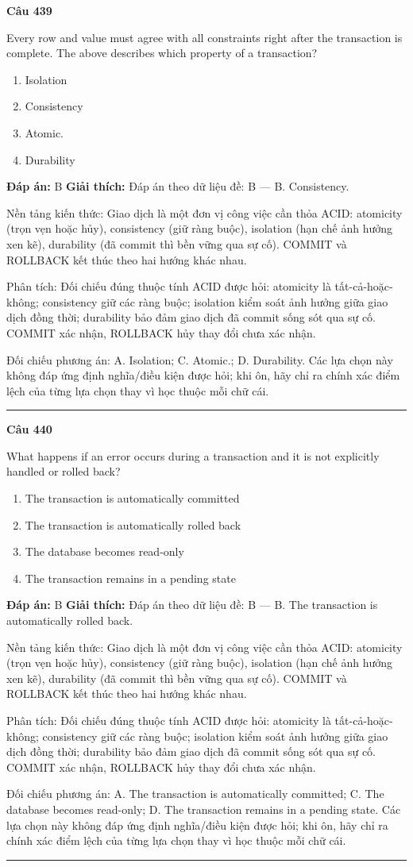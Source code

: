 \documentclass[11pt,a4paper]{article}
\newenvironment{question}[1]{%
  \par\vspace{1em}\noindent\textbf{\large Câu #1}\par\vspace{0.4em}
}{%
  \par\vspace{1em}\hrule\vspace{0.6em}
}
\newenvironment{choices}{%
  \begin{enumerate}[label=\textbf{\Alph*.},leftmargin=2.2em,itemsep=2pt,topsep=3pt]
}{%
  \end{enumerate}
}
\newcommand{\choice}{\item}
\begin{document}
\begin{question}{439}
Every row and value must agree with all constraints right after the transaction is complete. The above describes which property of a transaction?
\begin{choices}
\choice Isolation
\choice Consistency
\choice Atomic.
\choice Durability
\end{choices}
\textbf{Đáp án:} B
\textbf{Giải thích:} Đáp án theo dữ liệu đề: B — B. Consistency.

Nền tảng kiến thức: Giao dịch là một đơn vị công việc cần thỏa ACID: atomicity (trọn vẹn hoặc hủy), consistency (giữ ràng buộc), isolation (hạn chế ảnh hưởng xen kẽ), durability (đã commit thì bền vững qua sự cố). COMMIT và ROLLBACK kết thúc theo hai hướng khác nhau.

Phân tích: Đối chiếu đúng thuộc tính ACID được hỏi: atomicity là tất-cả-hoặc-không; consistency giữ các ràng buộc; isolation kiểm soát ảnh hưởng giữa giao dịch đồng thời; durability bảo đảm giao dịch đã commit sống sót qua sự cố. COMMIT xác nhận, ROLLBACK hủy thay đổi chưa xác nhận.

Đối chiếu phương án: A. Isolation; C. Atomic.; D. Durability. Các lựa chọn này không đáp ứng định nghĩa/điều kiện được hỏi; khi ôn, hãy chỉ ra chính xác điểm lệch của từng lựa chọn thay vì học thuộc mỗi chữ cái.
\end{question}

\begin{question}{440}
What happens if an error occurs during a transaction and it is not explicitly handled or rolled back?
\begin{choices}
\choice The transaction is automatically committed
\choice The transaction is automatically rolled back
\choice The database becomes read-only
\choice The transaction remains in a pending state
\end{choices}
\textbf{Đáp án:} B
\textbf{Giải thích:} Đáp án theo dữ liệu đề: B — B. The transaction is automatically rolled back.

Nền tảng kiến thức: Giao dịch là một đơn vị công việc cần thỏa ACID: atomicity (trọn vẹn hoặc hủy), consistency (giữ ràng buộc), isolation (hạn chế ảnh hưởng xen kẽ), durability (đã commit thì bền vững qua sự cố). COMMIT và ROLLBACK kết thúc theo hai hướng khác nhau.

Phân tích: Đối chiếu đúng thuộc tính ACID được hỏi: atomicity là tất-cả-hoặc-không; consistency giữ các ràng buộc; isolation kiểm soát ảnh hưởng giữa giao dịch đồng thời; durability bảo đảm giao dịch đã commit sống sót qua sự cố. COMMIT xác nhận, ROLLBACK hủy thay đổi chưa xác nhận.

Đối chiếu phương án: A. The transaction is automatically committed; C. The database becomes read-only; D. The transaction remains in a pending state. Các lựa chọn này không đáp ứng định nghĩa/điều kiện được hỏi; khi ôn, hãy chỉ ra chính xác điểm lệch của từng lựa chọn thay vì học thuộc mỗi chữ cái.
\end{question}
\end{document}
